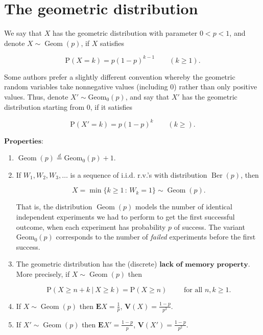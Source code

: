 \section{The geometric distribution}

We say that $X$ has the geometric distribution with
parameter $0<p<1$, and denote
$X\sim \operatorname{Geom}(p)$, if $X$ satisfies

\[
\mathrm{P}(X=k) = p(1-p)^{k-1} \qquad (k \ge 1).
\]

\noindent Some authors prefer a slightly different convention
whereby the geometric random variables take
nonnegative values (including $0$) rather than only
positive values. Thus, denote
$X' \sim \operatorname{Geom_0}(p)$, and say that $X'$
has the geometric distribution starting from $0$, if
it satisfies

\[
\mathrm{P}(X'=k) = p(1-p)^{k} \qquad (k \ge ).
\]

\noindent $\textbf{Properties:}$

\begin{enumerate}[label=\arabic*.]
\item $\operatorname{Geom}(p) \stackrel{d}{=}
\operatorname{Geom_0}(p) + 1$.

\item If $W_1,W_2,W_3, \ldots$ is a sequence of i.i.d.
r.v.'s with distribution $\operatorname{Ber}(p)$,
then

\[
X = \min\{ k\ge 1\,:\, W_k = 1\}  \sim \operatorname{Geom}(p).
\]

\noindent That is, the distribution $\operatorname{Geom}(p)$
models the number of identical independent experiments
we had to perform to get the first successful outcome,
when each experiment has probability $p$ of success.
The variant $\operatorname{Geom_0}(p)$ corresponds to
the number of \emph{failed} experiments before the first
success.

\item The geometric distribution has the (discrete)
$\textbf{lack of memory property}$. More precisely,
if $X \sim \operatorname{Geom}(p)$ then

\[
\mathrm{P}(X \ge n+k \ |\ X \ge k) = \mathrm{P}(X \ge n)\qquad \textrm{ for all $n,k\ge 1$}.
\]

\item If $X\sim \operatorname{Geom}(p)$ then
$\mathbf{E} X = \frac1p$,
$\mathbf{V}(X) = \frac{1-p}{p^2}$.

\item If $X'\sim \operatorname{Geom}(p)$ then
$\mathbf{E} X' = \frac{1-p}{p}$,
$\mathbf{V}(X') = \frac{1-p}{p^2}$.
\end{enumerate}

